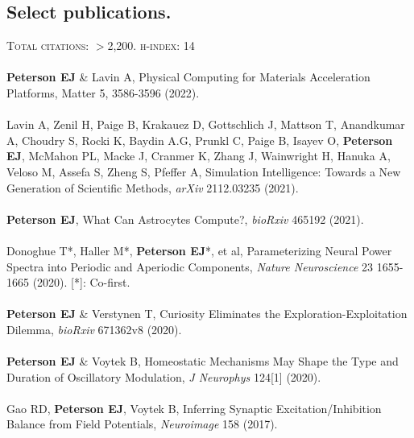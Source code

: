 \documentclass[margin,line]{res}
\begin{document}
\begin{resume}
\section{\sc Select publications.}
\textsc{Total citations}: $>$2,200. \textsc{h-index}: 14
\\ 
\vspace{-.25cm} 
\\
\textbf{Peterson EJ} \& Lavin A, Physical Computing for Materials Acceleration Platforms, Matter 5, 3586-3596 (2022).
\\ 
\vspace{-.35cm} 
\\
Lavin A, Zenil H, Paige B, Krakauez D, Gottschlich J, Mattson T, Anandkumar A, Choudry S, Rocki K, Baydin A.G, Prunkl C, Paige B, Isayev O, \textbf{Peterson EJ}, McMahon PL, Macke J, Cranmer K, Zhang J, Wainwright H, Hanuka A, Veloso M, Assefa S, Zheng S, Pfeffer A, Simulation Intelligence: Towards a New Generation of Scientific Methods, \emph{arXiv} 2112.03235 (2021).
\\ 
\vspace{-.35cm} 
\\
\textbf{Peterson EJ}, What Can Astrocytes Compute?, \emph{bioRxiv} 465192 (2021).
\\ 
\vspace{-.35cm} 
\\
Donoghue T*, Haller M*, \textbf{Peterson EJ}*, et al, Parameterizing Neural Power Spectra into Periodic and Aperiodic Components, \emph{Nature Neuroscience} 23 1655-1665 (2020). [*]: Co-first. 
\\ 
\vspace{-.35cm} 
\\
\textbf{Peterson EJ} \& Verstynen T, Curiosity Eliminates the Exploration-Exploitation Dilemma, \emph{bioRxiv} 671362v8 (2020). 
\\ 
\vspace{-.35cm} 
\\
\textbf{Peterson EJ} \& Voytek B, Homeostatic Mechanisms May Shape the Type and Duration of Oscillatory Modulation, \emph{J Neurophys} 124[1] (2020).
\\ 
\vspace{-.35cm} 
\\
Gao RD, \textbf{Peterson EJ}, Voytek B, Inferring Synaptic Excitation/Inhibition Balance from Field Potentials, \emph{Neuroimage} 158 (2017).

\end{resume}
\end{document}
